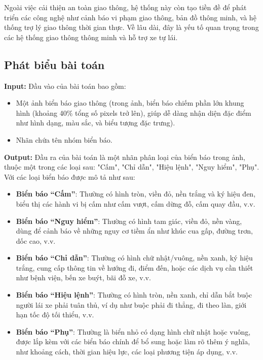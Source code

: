 \documentclass[a4paper,12pt]{article}
\begin{document}
Ngoài việc cải thiện an toàn giao thông, hệ thống này còn tạo tiền đề để phát triển các công nghệ như cảnh báo vi phạm giao thông, bản đồ thông minh, và hệ thống trợ lý giao thông thời gian thực. Về lâu dài, đây là yếu tố quan trọng trong các hệ thống giao thông thông minh và hỗ trợ xe tự lái.

\subsection{Phát biểu bài toán}
\textbf{Input:} Đầu vào của bài toán bao gồm: 
\begin{itemize}
    \item Một ảnh biển báo giao thông (trong ảnh, biển báo chiếm phần lớn khung hình (khoảng 40\% tổng số pixels trở lên), giúp dễ dàng nhận diện đặc điểm như hình dạng, màu sắc, và biểu tượng đặc trưng).
    \item Nhãn chứa tên nhóm biển báo.
\end{itemize}
\textbf{Output:} Đầu ra của bài toán là một nhãn phân loại của biển báo trong ảnh, thuộc một trong các loại sau: "Cấm", "Chỉ dẫn", "Hiệu lệnh", "Nguy hiểm", "Phụ".\\[0.2cm]
Với các loại biển báo được mô tả như sau:
\begin{itemize}
    \item \textbf{Biển báo “Cấm”}: Thường có hình tròn, viền đỏ, nền trắng và ký hiệu đen, biểu thị các hành vi bị cấm như cấm vượt, cấm dừng đỗ, cấm quay đầu, v.v.
    \item \textbf{Biển báo “Nguy hiểm”}: Thường có hình tam giác, viền đỏ, nền vàng, dùng để cảnh báo về những nguy cơ tiềm ẩn như khúc cua gấp, đường trơn, dốc cao, v.v.
    \item \textbf{Biển báo “Chỉ dẫn”}: Thường có hình chữ nhật/vuông, nền xanh, ký hiệu trắng, cung cấp thông tin về hướng đi, điểm đến, hoặc các dịch vụ cần thiết như bệnh viện, bến xe buýt, bãi đỗ xe, v.v.
    \item \textbf{Biển báo “Hiệu lệnh”}: Thường có hình tròn, nền xanh, chỉ dẫn bắt buộc người lái xe phải tuân thủ, ví dụ như buộc phải đi thẳng, đi theo làn, giới hạn tốc độ tối thiểu, v.v.
    \item \textbf{Biển báo “Phụ”}: Thường là biển nhỏ có dạng hình chữ nhật hoặc vuông, được lắp kèm với các biển báo chính để bổ sung hoặc làm rõ thêm ý nghĩa, như khoảng cách, thời gian hiệu lực, các loại phương tiện áp dụng, v.v.
\end{itemize}
\end{document}
